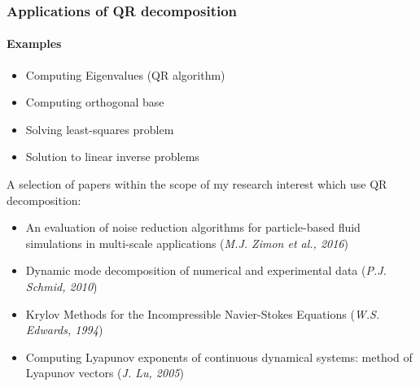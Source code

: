 \begin{frame}
\frametitle{Applications of QR decomposition}
\framesubtitle{Examples}
\begin{itemize}
 \item Computing Eigenvalues (QR algorithm)
 \item Computing orthogonal base 
 \item Solving least-squares problem
 \item Solution to linear inverse problems
\end{itemize}
A selection of papers within the scope of my research interest which use QR decomposition:
\begin{itemize}
 \item An evaluation of noise reduction algorithms for particle-based fluid simulations in multi-scale applications (\emph{M.J. Zimon et al., 2016})
 \item Dynamic mode decomposition of numerical and experimental data (\emph{P.J. Schmid, 2010})
 \item Krylov Methods for the Incompressible Navier-Stokes Equations (\emph{W.S. Edwards, 1994})
 \item Computing Lyapunov exponents of continuous dynamical systems: method of Lyapunov vectors (\emph{J. Lu, 2005})
\end{itemize}
\end{frame}

